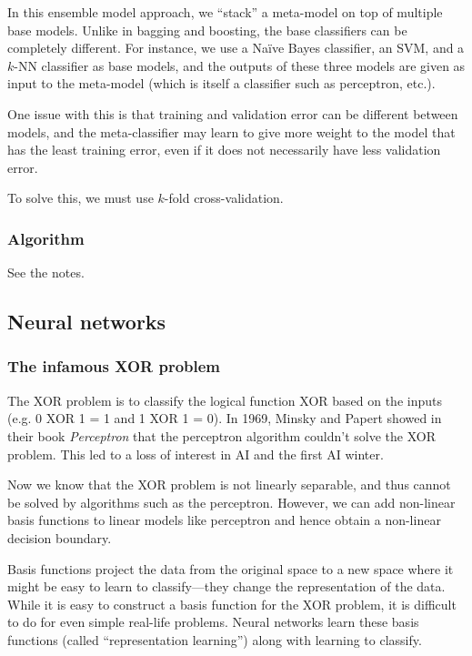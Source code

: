 \documentclass[a4paper,12pt]{article}
\begin{document}
In this ensemble model approach, we ``stack'' a meta-model on top of multiple base models. Unlike in bagging and boosting, the base classifiers can be completely different. For instance, we use a Naïve Bayes classifier, an SVM, and a $k$-NN classifier as base models, and the outputs of these three models are given as input to the meta-model (which is itself a classifier such as perceptron, etc.). 

One issue with this is that training and validation error can be different between models, and the meta-classifier may learn to give more weight to the model that has the least training error, even if it does not necessarily have less validation error. 

To solve this, we must use $k$-fold cross-validation. 

\subsubsection{Algorithm}

See the notes. 

\subsection{Neural networks}

\subsubsection{The infamous XOR problem}

The XOR problem is to classify the logical function XOR based on the inputs (e.g. 0 XOR 1 = 1 and 1 XOR 1 = 0). In 1969, Minsky and Papert showed in their book \textit{Perceptron} that the perceptron algorithm couldn't solve the XOR problem. This led to a loss of interest in AI and the first AI winter. 

Now we know that the XOR problem is not linearly separable, and thus cannot be solved by algorithms such as the perceptron. However, we can add non-linear basis functions to linear models like perceptron and hence obtain a non-linear decision boundary. 

Basis functions project the data from the original space to a new space where it might be easy to learn to classify---they change the representation of the data. While it is easy to construct a basis function for the XOR problem, it is difficult to do for even simple real-life problems. Neural networks learn these basis functions (called ``representation learning'') along with learning to classify. 
\end{document}
